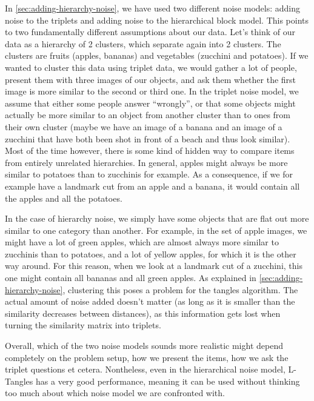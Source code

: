 In \autoref{sec:adding-hierarchy-noise}, we have used two different noise models: adding noise to the triplets and adding noise to the hierarchical block model. This points to two fundamentally different
assumptions about our data. Let's think of our data as a hierarchy of 2 clusters, which separate again into 2 clusters. The clusters are fruits (apples, bananas) and vegetables (zucchini and potatoes).
If we wanted to cluster this data using triplet data, we would gather a lot of people, present them with three images of our objects, and ask them whether the first image is more similar to the second or third one.
In the triplet noise model, we assume that either some people answer \enquote{wrongly}, or that some objects might actually be more similar to an object from another cluster than to ones
from their own cluster (maybe we have an image of a banana and an image of a zucchini that have both been shot in front of a beach and thus look similar). Most of the time however, there is some kind of 
hidden way to compare items from entirely unrelated hierarchies. In general, apples might always be more similar to potatoes than to zucchinis for example. As a consequence, if we for example have a landmark
cut from an apple and a banana, it would contain all the apples and all the potatoes. 

In the case of hierarchy noise, we simply have some objects that are flat out more similar to one category than another. For example, in the set of apple images, we might have a lot of green apples, which 
are almost always more similar to zucchinis than to potatoes, and a lot of yellow apples, for which it is the other way around. For this reason, when we look at a landmark cut of a zucchini, this one
might contain all bananas and all green apples. As explained in \autoref{sec:adding-hierarchy-noise}, clustering this poses a problem for the tangles algorithm. The actual amount of noise added doesn't matter
(as long as it is smaller than the similarity decreases between distances),  as this information gets lost when turning the similarity matrix into triplets.

Overall, which of the two noise models sounds more realistic might depend completely on the problem setup, how we present the items, how we ask the triplet questions et cetera. Nontheless, even in the
hierarchical noise model, L-Tangles has a very good performance, meaning it can be used without thinking too much about which noise model we are confronted with.

